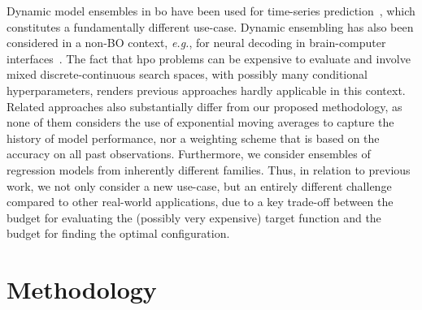 Dynamic model ensembles in \gls{bo} have been used for time-series prediction~\citep{Liu23}, which constitutes a fundamentally different use-case.
Dynamic ensembling has also been considered in a non-BO context, \emph{e.g.}, for neural decoding in brain-computer interfaces~\citep{QiEtAl19}.
The fact that \gls{hpo} problems can be expensive to evaluate and involve mixed discrete-continuous search spaces, with possibly many conditional hyperparameters, renders previous approaches hardly applicable in this context.
Related approaches also substantially differ from our proposed methodology, as none of them considers the use of exponential moving averages to capture the history of model performance, nor a weighting scheme that is based on the accuracy on all past observations.
Furthermore, we consider ensembles of regression models from inherently different families.
Thus, in relation to previous work, we not only consider a new use-case, but an entirely different challenge compared to other real-world applications, due to a key trade-off between the budget for evaluating the (possibly very expensive) target function and the budget for finding the optimal configuration.

\section{Methodology}
\label{sec:ch06:method}

